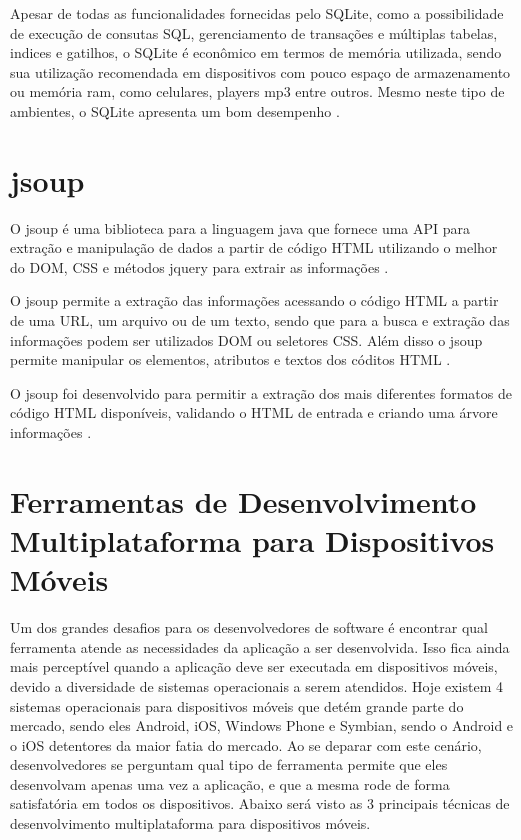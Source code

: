 Apesar de todas as funcionalidades fornecidas pelo SQLite, como a possibilidade de execução de consutas SQL, gerenciamento de transações e múltiplas tabelas, indices e gatilhos, o SQLite é econômico em termos de memória utilizada, sendo sua utilização recomendada em dispositivos com pouco espaço de armazenamento ou memória ram, como celulares, players mp3 entre outros. Mesmo neste tipo de ambientes, o SQLite apresenta um bom desempenho \cite{SQLite}.

\section{jsoup}
O jsoup é uma biblioteca para a linguagem java que fornece uma API para extração e manipulação de dados a partir de código HTML utilizando o melhor do DOM, CSS e métodos jquery para extrair as informações \cite{JSOUP}.

O jsoup permite a extração das informações acessando o código HTML a partir de uma URL, um arquivo ou de um texto, sendo que para a busca e extração das informações podem ser utilizados DOM ou seletores CSS. Além disso o jsoup permite manipular os elementos, atributos e textos dos códitos HTML \cite{JSOUP}.

O jsoup foi desenvolvido para permitir a extração dos mais diferentes formatos de código HTML disponíveis, validando o HTML de entrada e criando uma árvore informações \cite{JSOUP}.

\section{Ferramentas de Desenvolvimento Multiplataforma para Dispositivos Móveis}
Um dos grandes desafios para os desenvolvedores de software é encontrar qual ferramenta atende as necessidades da aplicação a ser desenvolvida. Isso fica ainda mais perceptível quando a aplicação deve ser executada em dispositivos móveis, devido a diversidade de sistemas operacionais a serem atendidos. Hoje existem 4 sistemas operacionais para dispositivos móveis que detém grande parte do mercado, sendo eles Android, iOS, Windows Phone e Symbian, sendo o Android e o iOS detentores da maior fatia do mercado. Ao se deparar com este cenário, desenvolvedores se perguntam qual tipo de ferramenta permite que eles desenvolvam apenas uma vez a aplicação, e que a mesma rode de forma satisfatória em todos os dispositivos. Abaixo será visto as 3 principais técnicas de desenvolvimento multiplataforma para dispositivos móveis\cite{CrossPlatformMobileDevelopment2011}.

